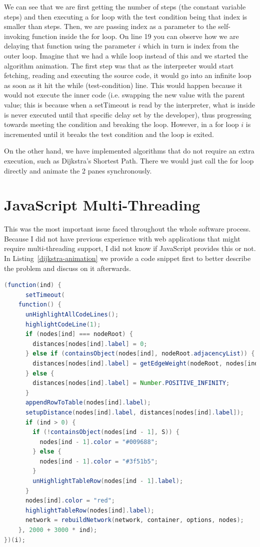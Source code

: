 \documentclass{l4proj}
\begin{document}
We can see that we are first getting the number of steps (the constant variable steps) and then executing a for loop with the test condition being
that index is smaller than steps. Then, we are passing index as a parameter to the self-invoking function inside the
for loop. On line 19 you can observe how we are delaying that function using the parameter $i$ which in turn is index
from the outer loop. Imagine that we had a while loop instead of this and we started the algorithm animation. The first
step was that as the interpreter would start fetching, reading and executing the source code, it would go into an
infinite loop as soon as it hit the while (test-condition) line. This would happen because it would not execute the
inner code (i.e. swapping the new value with the parent value; this is because when a setTimeout is read by the
interpreter, what is
inside is never executed until that specific delay set by the developer), thus progressing towards meeting the condition and
breaking the loop. However, in
a for loop $i$ is incremented until it breaks the test condition and the loop is exited.

On the other hand, we have implemented algorithms that do not require an extra execution, such as Dijkstra's
Shortest Path. There we would just call the for loop directly and animate the 2 panes synchronously.

\section{JavaScript Multi-Threading}

This was the most important issue faced throughout the whole software process. Because I did not have previous
experience with web applications that might require multi-threading support, I did not know if JavaScript provides this
or not. In Listing~\ref{dijkstra-animation} we provide a code snippet first to better describe the problem and discuss
on it afterwards.

\begin{lstlisting}[language={Java}, label={dijkstra-animation},caption={Animation function used in Dijkstra's SP
algorithm.}]
(function(ind) {
      setTimeout(
	function() {
	  unHighlightAllCodeLines();
	  highlightCodeLine(1);
	  if (nodes[ind] === nodeRoot) {
	    distances[nodes[ind].label] = 0;
	  } else if (containsObject(nodes[ind], nodeRoot.adjacencyList)) {
	    distances[nodes[ind].label] = getEdgeWeight(nodeRoot, nodes[ind]);
	  } else {
	    distances[nodes[ind].label] = Number.POSITIVE_INFINITY;
	  }
	  appendRowToTable(nodes[ind].label);
	  setupDistance(nodes[ind].label, distances[nodes[ind].label]);
	  if (ind > 0) {
	    if (!containsObject(nodes[ind - 1], S)) {
	      nodes[ind - 1].color = "#009688";
	    } else {
	      nodes[ind - 1].color = "#3f51b5";
	    }
	    unHighlightTableRow(nodes[ind - 1].label);
	  }
	  nodes[ind].color = "red";
	  highlightTableRow(nodes[ind].label);
	  network = rebuildNetwork(network, container, options, nodes);
	}, 2000 + 3000 * ind);
})(i);
\end{lstlisting}
\end{document}
